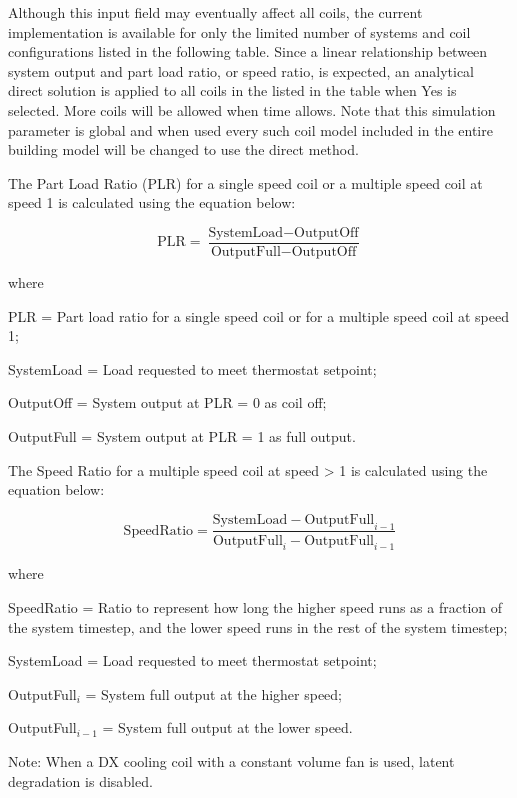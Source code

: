 Although this input field may eventually affect all coils, the current implementation is available for only the limited number of systems and coil configurations listed in the following table. Since a linear relationship between system output and part load ratio, or speed ratio, is expected, an analytical direct solution is applied to all coils in the listed in the table when Yes is selected. More coils will be allowed when time allows. Note that this simulation parameter is global and when used every such coil model included in the entire building model will be changed to use the direct method.

The Part Load Ratio (PLR) for a single speed coil or a multiple speed coil at speed 1 is calculated using the equation below:

\begin{equation}
    \textrm{PLR} = \frac{\textrm{SystemLoad} - \textrm{OutputOff}}{\textrm{OutputFull} - \textrm{OutputOff}}
\end{equation}

where

PLR = Part load ratio for a single speed coil or for a multiple speed coil at speed 1;

SystemLoad = Load requested to meet thermostat setpoint;

OutputOff = System output at PLR = 0 as coil off;

OutputFull = System output at PLR = 1 as full output.

The Speed Ratio for a multiple speed coil at speed > 1 is calculated using the equation below:

\begin{equation}
    \textrm{SpeedRatio} = \frac{\textrm{SystemLoad} - \textrm{OutputFull}_{i-1}}{\textrm{OutputFull}_{i} - \textrm{OutputFull}_{i-1}}
\end{equation}

where

SpeedRatio = Ratio to represent how long the higher speed runs as a fraction of the system timestep, and the lower speed runs in the rest of the system timestep;

SystemLoad = Load requested to meet thermostat setpoint;

OutputFull$_{i}$ = System full output at the higher speed;

OutputFull$_{i-1}$ = System full output at the lower speed.

Note: When a DX cooling coil with a constant volume fan is used, latent degradation is disabled.

